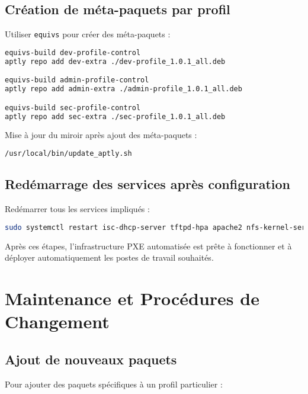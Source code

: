 \documentclass[a4paper,12pt]{article}
\begin{document}
\subsection{Création de méta-paquets par profil}

Utiliser \texttt{equivs} pour créer des méta-paquets :

\begin{lstlisting}[language=bash]
equivs-build dev-profile-control
aptly repo add dev-extra ./dev-profile_1.0.1_all.deb

equivs-build admin-profile-control
aptly repo add admin-extra ./admin-profile_1.0.1_all.deb

equivs-build sec-profile-control
aptly repo add sec-extra ./sec-profile_1.0.1_all.deb
\end{lstlisting}

Mise à jour du miroir après ajout des méta-paquets :

\begin{lstlisting}[language=bash]
/usr/local/bin/update_aptly.sh
\end{lstlisting}

\subsection{Redémarrage des services après configuration}

Redémarrer tous les services impliqués :

\begin{lstlisting}[language=bash]
sudo systemctl restart isc-dhcp-server tftpd-hpa apache2 nfs-kernel-server
\end{lstlisting}

Après ces étapes, l’infrastructure PXE automatisée est prête à fonctionner et à déployer automatiquement les postes de travail souhaités.

\section{Maintenance et Procédures de Changement}
\subsection{Ajout de nouveaux paquets}
Pour ajouter des paquets spécifiques à un profil particulier :
\end{document}
